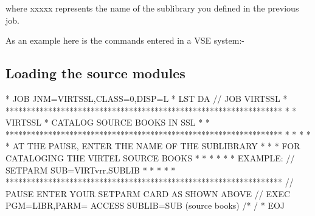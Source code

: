 \documentclass[letterpaper,10pt,english]{sphinxmanual}
\begin{document}
where xxxxx represents the name of the sublibrary you defined in the previous job.

As an example here is the commands entered in a VSE system:-

\begin{sphinxVerbatim}[commandchars=\\\{\}]
            
               
                                                             
                                                                    
    
   
    
       
\end{sphinxVerbatim}


\subsection{Loading the source modules}
\label{\detokenize{Installation_Guide:loading-the-source-modules}}
\begin{sphinxVerbatim}[commandchars=\\\{\}]
* \PYGZdl{}\PYGZdl{} JOB JNM=VIRTSSL,CLASS=0,DISP=L
* \PYGZdl{}\PYGZdl{} LST DA
// JOB VIRTSSL
* *****************************************************************
* * VIRTSSL * CATALOG SOURCE BOOKS IN SSL                         *
* *****************************************************************
* *                                                               *
* * AT THE PAUSE, ENTER THE NAME OF THE SUB\PYGZhy{}LIBRARY               *
* * FOR CATALOGING THE VIRTEL SOURCE BOOKS                        *
* *                                                               *
* * EXAMPLE: // SETPARM SUB=\PYGZsq{}VIRTvrr.SUBLIB\PYGZsq{}                      *
* *                                                               *
* *****************************************************************
// PAUSE ENTER YOUR SETPARM CARD AS SHOWN ABOVE
// EXEC PGM=LIBR,PARM=\PYGZsq{} ACCESS SUBLIB=\PYGZam{}SUB\PYGZsq{}
        (source books)
/*
/\PYGZam{}
* \PYGZdl{}\PYGZdl{} EOJ
\end{sphinxVerbatim}
\end{document}
